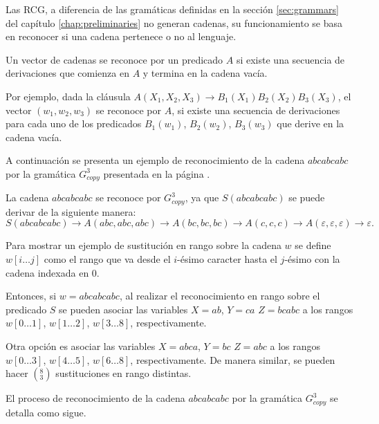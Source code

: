 Las RCG, a diferencia de las gramáticas definidas en la sección \ref{sec:grammars} del capítulo \ref{chap:preliminaries} no generan cadenas, su funcionamiento se basa en reconocer si una cadena pertenece o no al lenguaje.

Un vector de cadenas se reconoce por un predicado $A$ si existe una secuencia de derivaciones que comienza en $A$ y termina en la cadena vacía.

Por ejemplo, dada la cláusula $A(X_1,X_2,X_3)\to B_1(X_1)B_2(X_2)B_3(X_3)$, el vector $(w_1,w_2,w_3)$ se reconoce por $A$, si existe una secuencia de derivaciones para cada uno de los predicados $B_1(w_1)$, $B_2(w_2)$, $B_3(w_3)$ que derive en la cadena vacía.

A continuación se presenta un ejemplo de reconocimiento de la cadena $abcabcabc$ por la gramática $G^3_{copy}$
presentada en la página \pageref{g_3copy}.

La cadena $abcabcabc$ se reconoce por $G^3_{copy}$, ya que $S(abcabcabc)$ se puede derivar de la siguiente manera:
$$S(abcabcabc)\to A(abc,abc,abc)\to A(bc,bc,bc)\to A(c,c,c)\to A(\varepsilon,\varepsilon,\varepsilon)\to \varepsilon.$$

Para mostrar un ejemplo de sustitución en rango sobre la cadena $w$ se define $w[i\dots j]$ como el rango que va desde el $i$-ésimo caracter hasta el $j$-ésimo con la cadena indexada en 0.

Entonces, si $w=abcabcabc$, al realizar el reconocimiento en rango sobre el predicado $S$ se pueden asociar las variables $X=ab$, $Y=ca$ $Z=bcabc$ a los rangos $w[0\dots 1]$, $w[1\dots 2]$, $w[3\dots 8]$, respectivamente.

Otra opción es asociar las variables $X=abca$, $Y=bc$ $Z=abc$ a los rangos $w[0\dots 3]$, $w[4\dots 5]$, $w[6\dots 8]$, respectivamente. De manera similar, se pueden hacer $(^8_3)$ sustituciones en rango distintas. 

El proceso de reconocimiento de la cadena $abcabcabc$ por la gramática $G^3_{copy}$ se detalla como sigue.

